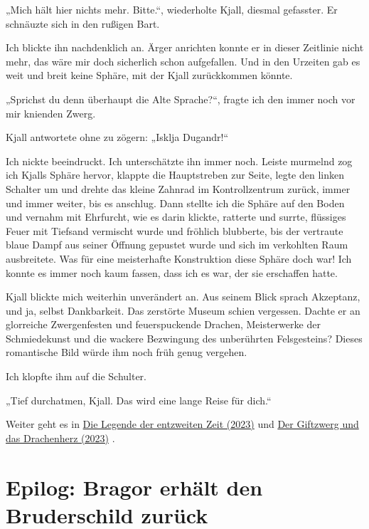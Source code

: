 \documentclass[10pt, a4paper, oneside]{book}
\newcommand{\hypref}[1]{%
    \hyperref[#1]{#1}%
}
\begin{document}
„Mich hält hier nichts mehr. Bitte.“, wiederholte Kjall, diesmal gefasster. Er schnäuzte sich in den rußigen Bart.

Ich blickte ihn nachdenklich an. Ärger anrichten konnte er in dieser Zeitlinie nicht mehr, das wäre mir doch sicherlich schon aufgefallen. Und in den Urzeiten gab es weit und breit keine Sphäre, mit der Kjall zurückkommen könnte.

„Sprichst du denn überhaupt die Alte Sprache?“, fragte ich den immer noch vor mir knienden Zwerg.

Kjall antwortete ohne zu zögern: „Isklja Dugandr!“

Ich nickte beeindruckt. Ich unterschätzte ihn immer noch. Leiste murmelnd zog ich Kjalls Sphäre hervor, klappte die Hauptstreben zur Seite, legte den linken Schalter um und drehte das kleine Zahnrad im Kontrollzentrum zurück, immer und immer weiter, bis es anschlug. Dann stellte ich die Sphäre auf den Boden und vernahm mit Ehrfurcht, wie es darin klickte, ratterte und surrte, flüssiges Feuer mit Tiefsand vermischt wurde und fröhlich blubberte, bis der vertraute blaue Dampf aus seiner Öffnung gepustet wurde und sich im verkohlten Raum ausbreitete. Was für eine meisterhafte Konstruktion diese Sphäre doch war! Ich konnte es immer noch kaum fassen, dass ich es war, der sie erschaffen hatte.

Kjall blickte mich weiterhin unverändert an. Aus seinem Blick sprach Akzeptanz, und ja, selbst Dankbarkeit. Das zerstörte Museum schien vergessen. Dachte er an glorreiche Zwergenfesten und feuerspuckende Drachen, Meisterwerke der Schmiedekunst und die wackere Bezwingung des unberührten Felsgesteins? Dieses romantische Bild würde ihm noch früh genug vergehen.

Ich klopfte ihm auf die Schulter.

„Tief durchatmen, Kjall. Das wird eine lange Reise für dich.“


\begin{center}
    Weiter geht es in \hypref{Die Legende der entzweiten Zeit (2023)} und \hypref{Der Giftzwerg und das Drachenherz (2023)}.
\end{center}








\newpage
\section{Epilog: Bragor erhält den Bruderschild zurück}
\end{document}
